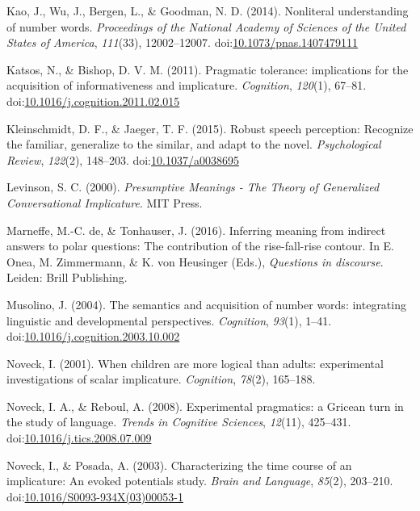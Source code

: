 \documentclass[man]{apa6}
\theoremstyle{definition}
\theoremstyle{definition}
\theoremstyle{definition}
\theoremstyle{remark}
\begin{document}
\hypertarget{ref-Kao2014}{}
Kao, J., Wu, J., Bergen, L., \& Goodman, N. D. (2014). Nonliteral
understanding of number words. \emph{Proceedings of the National Academy
of Sciences of the United States of America}, \emph{111}(33),
12002--12007.
doi:\href{https://doi.org/10.1073/pnas.1407479111}{10.1073/pnas.1407479111}

\hypertarget{ref-Katsos2011}{}
Katsos, N., \& Bishop, D. V. M. (2011). Pragmatic tolerance:
implications for the acquisition of informativeness and implicature.
\emph{Cognition}, \emph{120}(1), 67--81.
doi:\href{https://doi.org/10.1016/j.cognition.2011.02.015}{10.1016/j.cognition.2011.02.015}

\hypertarget{ref-Kleinschmidt2015}{}
Kleinschmidt, D. F., \& Jaeger, T. F. (2015). Robust speech perception:
Recognize the familiar, generalize to the similar, and adapt to the
novel. \emph{Psychological Review}, \emph{122}(2), 148--203.
doi:\href{https://doi.org/10.1037/a0038695}{10.1037/a0038695}

\hypertarget{ref-levinson2000}{}
Levinson, S. C. (2000). \emph{Presumptive Meanings - The Theory of
Generalized Conversational Implicature}. MIT Press.

\hypertarget{ref-DeMarneffe2017}{}
Marneffe, M.-C. de, \& Tonhauser, J. (2016). Inferring meaning from
indirect answers to polar questions: The contribution of the
rise-fall-rise contour. In E. Onea, M. Zimmermann, \& K. von Heusinger
(Eds.), \emph{Questions in discourse}. Leiden: Brill Publishing.

\hypertarget{ref-Musolino2004}{}
Musolino, J. (2004). The semantics and acquisition of number words:
integrating linguistic and developmental perspectives. \emph{Cognition},
\emph{93}(1), 1--41.
doi:\href{https://doi.org/10.1016/j.cognition.2003.10.002}{10.1016/j.cognition.2003.10.002}

\hypertarget{ref-Noveck2001}{}
Noveck, I. (2001). When children are more logical than adults:
experimental investigations of scalar implicature. \emph{Cognition},
\emph{78}(2), 165--188.

\hypertarget{ref-noveck2008}{}
Noveck, I. A., \& Reboul, A. (2008). Experimental pragmatics: a Gricean
turn in the study of language. \emph{Trends in Cognitive Sciences},
\emph{12}(11), 425--431.
doi:\href{https://doi.org/10.1016/j.tics.2008.07.009}{10.1016/j.tics.2008.07.009}

\hypertarget{ref-Noveck2003}{}
Noveck, I., \& Posada, A. (2003). Characterizing the time course of an
implicature: An evoked potentials study. \emph{Brain and Language},
\emph{85}(2), 203--210.
doi:\href{https://doi.org/10.1016/S0093-934X(03)00053-1}{10.1016/S0093-934X(03)00053-1}
\end{document}
